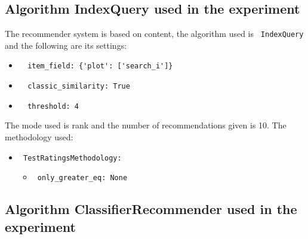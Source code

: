 \documentclass[11pt]{article}
\begin{document}
\subsection{Algorithm IndexQuery used in the experiment}\label{subsec:algo_IndexQuery}

The recommender system is based on content, the algorithm used
is \verb| IndexQuery | and the following are its settings:
\begin{itemize}
\item \begin{verbatim}
  item_field: {'plot': ['search_i']}
\end{verbatim}
\item \begin{verbatim}
  classic_similarity: True
\end{verbatim}
\item \begin{verbatim}
  threshold: 4
\end{verbatim}
\end{itemize}
\hfill\break
The mode used is rank and the number of recommendations given
is 10.
The methodology used:
\begin{itemize}
    \item \verb| TestRatingsMethodology:|
    \begin{itemize}
                    \item \verb| only_greater_eq: None |
            \end{itemize}
\end{itemize}
\hfill\break



\hfill\break
\hfill\break



\subsection{Algorithm ClassifierRecommender used in the experiment}\label{subsec:algo_ClassifierRecommender}
\end{document}
